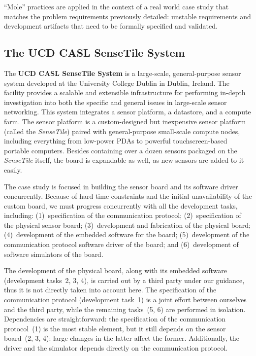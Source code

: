 \documentclass{article}
\newcommand{\ST}{\emph{SenseTile}\xspace}
\begin{document}
``Mole'' practices are applied in the context of a real world case study that matches the problem requirements previously detailed: unstable requirements and development artifacts that need to be formally specified and validated.  

\subsection{The UCD CASL SenseTile System}
\label{sec:ucd-casl-sensetile}

The \textbf{UCD CASL SenseTile System} is a large-scale, general-purpose sensor system developed at the University College Dublin in Dublin, Ireland.  
The facility provides a scalable and extensible infrastructure for performing in-depth investigation into both the specific and general issues in large-scale sensor networking. 
This system integrates a sensor platform, a datastore, and a compute farm.  
The sensor platform is a custom-designed but inexpensive sensor platform (called the \ST) paired with general-purpose small-scale compute nodes, including everything from low-power PDAs to powerful touchscreen-based portable computers.  
Besides containing over a dozen sensors packaged on the \ST itself, the board is expandable as well, as new sensors are added to it easily.

The case study is focused in building the sensor board and its software driver concurrently.  
Because of hard time constraints and the initial unavailability of the custom board, we must progress concurrently with all the development tasks, including: (1)~specification of the communication protocol; (2)~specification of the physical sensor board; (3)~development and fabrication of the physical board; (4)~development of the embedded software for the board; (5)~development of the communication protocol software driver of the board; and (6)~development of software simulators of the board.

The development of the physical board, along with its embedded software (development tasks~2, 3, 4), is carried out by a third party under our guidance, thus it is not directly taken into account here. 
The specification of the communication protocol (development task~1) is a joint effort between ourselves and the third party, while the remaining tasks~(5, 6) are performed in isolation.  
Dependencies are straightforward: the specification of the communication protocol~(1) is the most stable element, but it still depends on the sensor board~(2, 3, 4): large changes in the latter affect the former.
Additionally, the driver and the simulator depends directly on the communication protocol.
\end{document}
